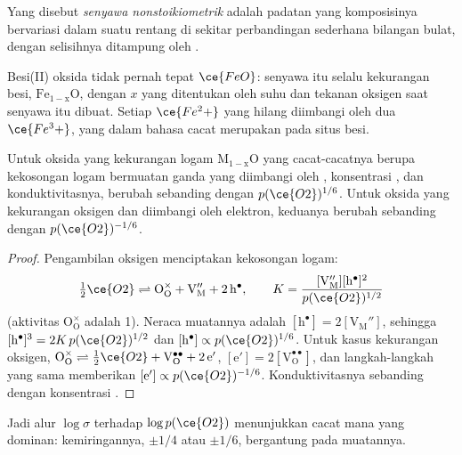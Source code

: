 \begin{definition}\label{def:b3:solid-state:non-stoichiometric}
Yang disebut \emph{senyawa nonstoikiometrik} adalah
padatan yang komposisinya bervariasi dalam suatu rentang di sekitar perbandingan sederhana bilangan
bulat, dengan selisihnya ditampung oleh .
\end{definition}

Besi(II) oksida tidak pernah tepat $\ce{FeO}$: senyawa itu selalu kekurangan besi,
$\mathrm{Fe_{1-x}O}$, dengan $x$ yang ditentukan oleh suhu dan tekanan oksigen saat senyawa itu dibuat. Setiap $\ce{Fe^2+}$ yang hilang diimbangi oleh dua
$\ce{Fe^3+}$, yang dalam bahasa cacat merupakan  pada situs besi.

\begin{proposition}\label{prop:b3:solid-state:brouwer}
Untuk oksida yang kekurangan logam $\mathrm{M_{1-x}O}$ yang cacat-cacatnya berupa kekosongan logam bermuatan ganda
yang diimbangi oleh , konsentrasi , dan konduktivitasnya, berubah sebanding dengan
$p(\ce{O2})^{1/6}$. Untuk oksida yang kekurangan oksigen dan diimbangi oleh elektron, keduanya berubah sebanding dengan
$p(\ce{O2})^{-1/6}$.
\end{proposition}

\begin{proof}
Pengambilan oksigen menciptakan kekosongan logam:
\[
  \tfrac12\ce{O2} \rightleftharpoons \mathrm{O_O^{\times} + V_M'' + 2\,h^{\bullet}}, \qquad K = \frac{[\mathrm{V_M''}][\mathrm h^\bullet]^2}{p(\ce{O2})^{1/2}}
\]
(aktivitas $\mathrm{O_O^{\times}}$ adalah 1). Neraca
muatannya adalah $[\mathrm h^\bullet] = 2[\mathrm{V_M''}]$, sehingga $[\mathrm h^\bullet]^3 = 2K\,p(\ce{O2})^{1/2}$ dan $[\mathrm h^\bullet] \propto p(\ce{O2})^{1/6}$. Untuk
kasus kekurangan oksigen, $\mathrm{O_O^{\times}} \rightleftharpoons \tfrac12\ce{O2} + \mathrm{V_O^{\bullet\bullet} + 2\,e'}$, $[\mathrm e'] = 2[\mathrm{V_O^{\bullet\bullet}}]$, dan langkah-langkah yang sama memberikan $[\mathrm e'] \propto p(\ce{O2})^{-1/6}$.
Konduktivitasnya sebanding dengan konsentrasi .
\end{proof}

Jadi alur $\log\sigma$ terhadap $\log p(\ce{O2})$ menunjukkan cacat mana yang dominan: kemiringannya,
$\pm 1/4$ atau $\pm 1/6$, bergantung pada muatannya.

